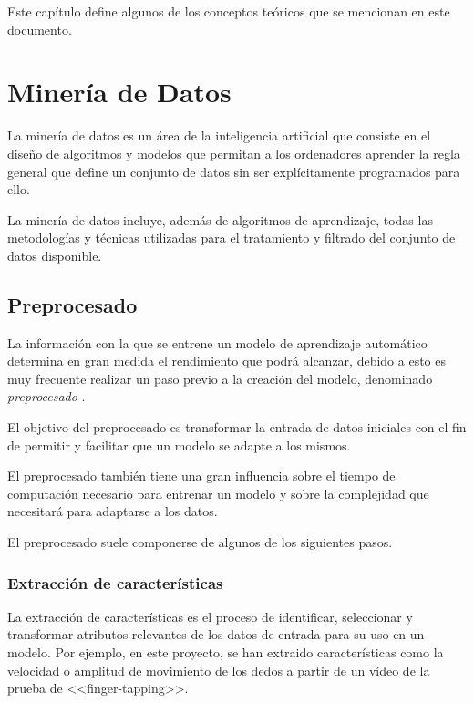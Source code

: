 \label{cha:Conceptos teóricos}

Este capítulo define algunos de los conceptos teóricos que se mencionan en este
documento.

\section{Minería de Datos}

La minería de datos es un área de la inteligencia artificial que consiste en el
diseño de algoritmos y modelos que permitan a los ordenadores aprender la regla
general que define un conjunto de datos sin ser explícitamente programados para
ello.

La minería de datos incluye, además de algoritmos de aprendizaje, todas las
metodologías y técnicas utilizadas para el tratamiento y filtrado del conjunto
de datos disponible.

\subsection{Preprocesado}

La información con la que se entrene un modelo de aprendizaje automático
determina en gran medida el rendimiento que podrá alcanzar, debido a esto es muy
frecuente realizar un paso previo a la creación del modelo, denominado
\textit{preprocesado} \cite{enwiki:1138293751}.

El objetivo del preprocesado es transformar la entrada de datos iniciales con el
fin de permitir y facilitar que un modelo se adapte a los mismos.

El preprocesado también tiene una gran influencia sobre el tiempo de computación
necesario para entrenar un modelo y sobre la complejidad que necesitará para
adaptarse a los datos.

El preprocesado suele componerse de algunos de los siguientes pasos.

\subsubsection{Extracción de características}

La extracción de características es el proceso de identificar, seleccionar y
transformar atributos relevantes de los datos de entrada para su uso en un
modelo. Por ejemplo, en este proyecto, se han extraido características como la
velocidad o amplitud de movimiento de los dedos a partir de un vídeo de la
prueba de <<finger-tapping>>.

